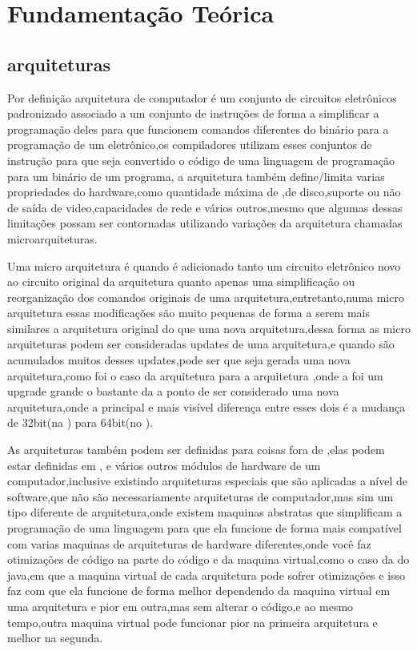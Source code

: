 \documentclass[
	12pt,				%
	openright,			%
	oneside,			%
	a4paper,			%
	english,			%
	french,				%
	spanish,			%
	brazil,				%
	]{abntex2}
\begin{document}
\chapter{Fundamentação Teórica}
\label{ch: fundamentacao teorica}



\section{arquiteturas}
\label{sec: arquiteturas}
Por definição arquitetura de computador é um conjunto de circuitos eletrônicos padronizado associado a um conjunto de instruções de forma a simplificar a programação deles para que funcionem comandos diferentes do binário para a programação de um eletrônico,os compiladores utilizam esses conjuntos de instrução para que seja convertido o código de uma linguagem de programação para um binário de um programa, a arquitetura também define/limita varias propriedades do hardware,como quantidade máxima de ,de disco,suporte ou não de saída de video,capacidades de rede e vários outros,mesmo que algumas dessas limitações possam ser contornadas utilizando variações da arquitetura chamadas microarquiteturas.\newline

Uma micro arquitetura é quando é adicionado tanto um circuito eletrônico novo ao circuito original da arquitetura quanto apenas uma simplificação ou reorganização dos comandos originais de uma arquitetura,entretanto,numa micro arquitetura essas modificações são muito pequenas de forma a serem mais similares a arquitetura original do que uma nova arquitetura,dessa forma as micro arquiteturas podem ser consideradas updates de uma arquitetura,e quando são acumulados muitos desses updates,pode ser que seja gerada uma nova arquitetura,como foi o caso da arquitetura  para a arquitetura ,onde a  foi um upgrade grande o bastante da  a ponto de ser considerado uma nova arquitetura,onde a principal e mais visível diferença entre esses dois é a mudança de 32bit(na ) para 64bit(no ).\newline

As arquiteturas também podem ser definidas para coisas fora de ,elas podem estar definidas em , e vários outros módulos de hardware de um computador,inclusive existindo arquiteturas especiais que são aplicadas a nível de software,que não são necessariamente arquiteturas de computador,mas sim um tipo diferente de arquitetura,onde existem maquinas abstratas que simplificam a programação de uma linguagem para que ela funcione de forma mais compatível com varias maquinas de arquiteturas de hardware diferentes,onde você faz otimizações de código na parte do código e da maquina virtual,como o caso da  do java,em que a maquina virtual de cada arquitetura pode sofrer otimizações e isso faz com que ela funcione de forma melhor dependendo da maquina virtual em uma arquitetura e pior em outra,mas sem alterar o código,e ao mesmo tempo,outra maquina virtual pode funcionar pior na primeira arquitetura e melhor na segunda.\newline
\end{document}
